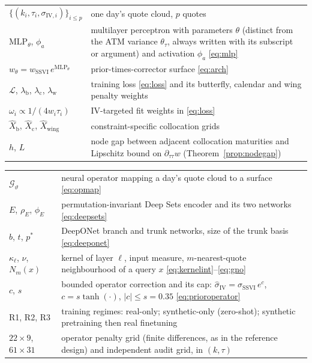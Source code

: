\documentclass[11pt,a4paper]{report}
\theoremstyle{definition}
\theoremstyle{remark}
\theoremstyle{plain}
\begin{document}
\noindent\begin{tabular}{@{}p{}@{\hspace{6pt}}p{}@{}}
\toprule
$\{(k_i,\tau_i,\sigma_{\mathrm{IV},i})\}_{i\le p}$ & one day's quote cloud, $p$ quotes \\
$\mathrm{MLP}_\theta$, $\phi_a$ & multilayer perceptron with parameters $\theta$ (distinct from the ATM variance $\theta_\tau$, always written with its subscript or argument) and activation $\phi_a$ \eqref{eq:mlp} \\
$w_\theta=w_{\mathrm{SSVI}}\,e^{\mathrm{MLP}_\theta}$ & prior-times-corrector surface \eqref{eq:arch} \\
$\mathcal L$, $\lambda_{\mathrm b}$, $\lambda_{\mathrm c}$, $\lambda_{\mathrm w}$ & training loss \eqref{eq:loss} and its butterfly, calendar and wing penalty weights \\
$\omega_i\propto 1/(4w_i\tau_i)$ & IV-targeted fit weights in \eqref{eq:loss} \\
$\hat X_{\mathrm b}$, $\hat X_{\mathrm c}$, $\hat X_{\mathrm{wing}}$ & constraint-specific collocation grids \\
$h$, $L$ & node gap between adjacent collocation maturities and Lipschitz bound on $\partial_{\tau\tau}w$ (Theorem~\ref{prop:nodegap}) \\
\bottomrule
\end{tabular}

\newpage

\noindent\begin{tabular}{@{}p{}@{\hspace{6pt}}p{}@{}}
\toprule
$\mathcal G_\vartheta$ & neural operator mapping a day's quote cloud to a surface \eqref{eq:opmap} \\
$E$, $\rho_E$, $\phi_E$ & permutation-invariant Deep Sets encoder and its two networks \eqref{eq:deepsets} \\
$b$, $t$, $p^{\ast}$ & DeepONet branch and trunk networks, size of the trunk basis \eqref{eq:deeponet} \\
$\kappa_\ell$, $\nu$, $N_m(x)$ & kernel of layer $\ell$, input measure, $m$-nearest-quote neighbourhood of a query $x$ \eqref{eq:kernelint}--\eqref{eq:gno} \\
$c$, $s$ & bounded operator correction and its cap: $\widehat\sigma_{\mathrm{IV}}=\sigma_{\mathrm{SSVI}}\,e^{c}$, $c=s\tanh(\cdot)$, $|c|\le s=0.35$ \eqref{eq:prioroperator} \\
R1, R2, R3 & training regimes: real-only; synthetic-only (zero-shot); synthetic pretraining then real finetuning \\
$22\times9$, $61\times31$ & operator penalty grid (finite differences, as in the reference design) and independent audit grid, in $(k,\tau)$ \\
\bottomrule
\end{tabular}
\end{document}
